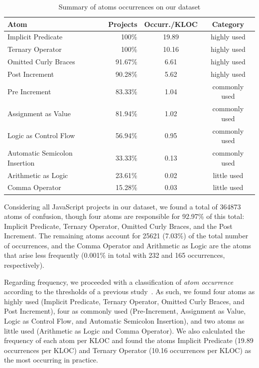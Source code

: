 \begin{table}[ht]
\centering
\caption{Summary of atoms occurrences on our dataset}
\setlength\tabcolsep{2pt} %
\label{tab:occurrences-summary}
\begin{tabular}{lrcc}
  \hline
Atom & Projects & Occurr./KLOC & Category \\ 
  \hline
Implicit Predicate & 100\% & 19.89 &  highly used \\ 
  Ternary Operator & 100\% & 10.16 &  highly used \\ 
  Omitted Curly Braces & 91.67\% & 6.61 &  highly used \\ 
  Post Increment & 90.28\% & 5.62 &  highly used \\ 
  Pre Increment & 83.33\% & 1.04 & commonly used \\ 
  Assignment as Value & 81.94\% & 1.02 & commonly used \\ 
  Logic as Control Flow & 56.94\% & 0.95 & commonly used \\ 
  Automatic Semicolon Insertion & 33.33\% & 0.13 & commonly used \\ 
  Arithmetic as Logic & 23.61\% & 0.02 & little used \\ 
  Comma Operator & 15.28\% & 0.03 & little used \\ 
   \hline
\end{tabular}
\end{table}


Considering all JavaScript projects in our dataset, we found 
a total of \num{364873} atoms of confusion, though four atoms are responsible
for 92.97\% of this total: Implicit Predicate, Ternary Operator, Omitted Curly Braces, and the Post Increment. The remaining atoms
account for \num{25621} (7.03\%) of the total number of occurrences, and the
Comma Operator and Arithmetic as Logic are the atoms that arise less
frequently (0.001\% in total with 232 and 165 occurrences, respectively). 

Regarding frequency, we proceeded with a classification of \emph{atom occurrence}
according to the thresholds of a previous
study~\cite{DBLP:journals/ese/MedeirosLAAKRG19}. As such, we found four
atoms as highly used (Implicit Predicate, Ternary Operator, Omitted Curly Braces, and Post Increment),
four as commonly used (Pre-Increment, Assignment as Value,
Logic as Control Flow, and Automatic Semicolon Insertion),
and two atoms as little used (Arithmetic as Logic and Comma Operator).
We also calculated the frequency of each atom per KLOC and found the atoms
Implicit Predicate (19.89 occurrences per KLOC) and Ternary Operator (10.16
occurrences per KLOC) as the most occurring
in practice.

